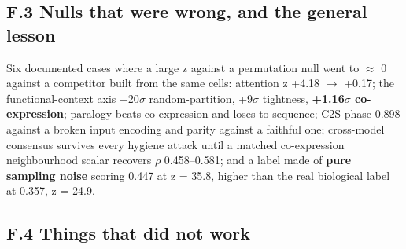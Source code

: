 \hypertarget{f.3-nulls-that-were-wrong-and-the-general-lesson}{%
\subsection{F.3 Nulls that were wrong, and the general lesson}\label{f.3-nulls-that-were-wrong-and-the-general-lesson}}

Six documented cases where a large z against a permutation null went to \(\approx\) 0 against a competitor built
from the same cells: attention z +4.18 \(\rightarrow\) +0.17; the functional-context axis +20\(\sigma\) random-partition, +9\(\sigma\)
tightness, \textbf{+1.16\(\sigma\) co-expression}; paralogy beats co-expression and loses to sequence; C2S phase
0.898 against a broken input encoding and parity against a faithful one; cross-model consensus survives
every hygiene attack until a matched co-expression neighbourhood scalar recovers \(\rho\) 0.458--0.581; and a
label made of \textbf{pure sampling noise} scoring 0.447 at z = 35.8, higher than the real biological label
at 0.357, z = 24.9.

\hypertarget{f.4-things-that-did-not-work}{%
\subsection{F.4 Things that did not work}\label{f.4-things-that-did-not-work}}

